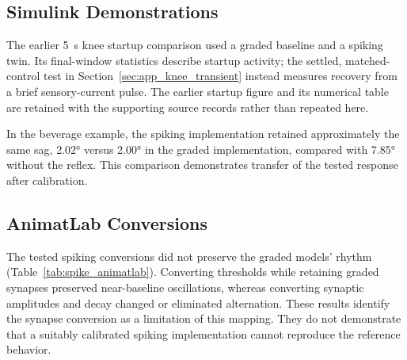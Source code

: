 \subsection{Simulink Demonstrations}

The earlier \qty{5}{\second} knee startup comparison used a graded baseline and a spiking twin. Its final-window statistics describe startup activity; the settled, matched-control test in Section~\ref{sec:app_knee_transient} instead measures recovery from a brief sensory-current pulse. The earlier startup figure and its numerical table are retained with the supporting source records rather than repeated here.

In the beverage example, the spiking implementation retained approximately the same sag, \ang{2.02} versus \ang{2.00} in the graded implementation, compared with \ang{7.85} without the reflex. This comparison demonstrates transfer of the tested response after calibration.

\subsection{AnimatLab Conversions}

The tested spiking conversions did not preserve the graded models' rhythm (Table~\ref{tab:spike_animatlab}). Converting thresholds while retaining graded synapses preserved near-baseline oscillations, whereas converting synaptic amplitudes and decay changed or eliminated alternation. These results identify the synapse conversion as a limitation of this mapping. They do not demonstrate that a suitably calibrated spiking implementation cannot reproduce the reference behavior.

